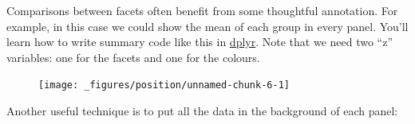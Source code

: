 Comparisons between facets often benefit from some thoughtful
annotation. For example, in this case we could show the mean of each
group in every panel. You'll learn how to write summary code like this
in \protect\hyperlink{cha:dplyr}{dplyr}. Note that we need two ``z''
variables: one for the facets and one for the colours.

\begin{Shaded}
\end{Shaded}

\begin{figure}[H]
  \texttt{[image: \_figures/position/unnamed-chunk-6-1]}
\end{figure}

Another useful technique is to put all the data in the background of
each panel:

\begin{Shaded}
\begin{Highlighting}[]
\StringTok{ }\OperatorTok{::}\OperatorTok{-}

\OperatorTok{+}\StringTok{ }
\StringTok{  }\NormalTok{(} \NormalTok{) }\OperatorTok{+}
\StringTok{  }\NormalTok{(}\NormalTok{(}\OperatorTok{+}\StringTok{ }
\StringTok{  }\NormalTok{(}\OperatorTok{~}
\end{Highlighting}
\end{Shaded}

